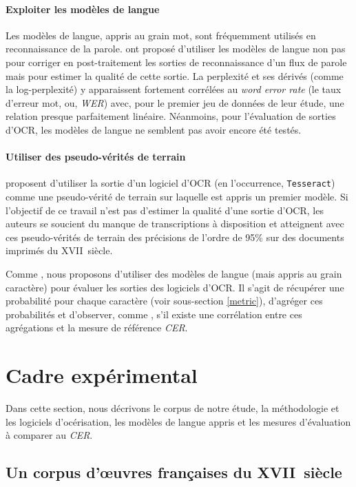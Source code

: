 \documentclass[10pt,twoside]{article}
\begin{document}
    \paragraph{Exploiter les modèles de langue}
    Les modèles de langue, appris au grain mot, sont fréquemment utilisés en reconnaissance de la parole. 
    \cite{Chen1998a} ont proposé d'utiliser les modèles de langue non pas pour corriger en post-traitement les 
    sorties de reconnaissance d'un flux de parole mais pour estimer la qualité de cette sortie. La perplexité et ses dérivés 
    (comme la log-perplexité) y apparaissent fortement corrélées au \textit{word error rate} (le taux d'erreur mot, ou, 
    \textit{WER}) avec, pour le premier jeu de données de leur étude, une relation presque parfaitement linéaire. 
    Néanmoins, pour l'évaluation de sorties d'OCR, les modèles de langue ne semblent pas avoir encore été testés.

    \paragraph{Utiliser des pseudo-vérités de terrain}
    \cite{UlHasan2016a} proposent d'utiliser la sortie d'un logiciel d'OCR (en l'occurrence, \verb!Tesseract!)
    comme une pseudo-vérité de terrain sur laquelle est appris un premier modèle. Si l'objectif de ce travail n'est 
    pas d'estimer la qualité d'une sortie d'OCR, les auteurs se soucient du manque de transcriptions à disposition
    et atteignent avec ces pseudo-vérités de terrain des précisions de l'ordre de 95\% sur des documents imprimés du
    XVII\ieme~siècle.

Comme \cite{Chen1998a}, nous proposons d'utiliser des modèles de langue (mais appris au grain caractère)
pour évaluer les sorties des logiciels d'OCR. Il s'agit de récupérer une probabilité pour chaque caractère (voir
sous-section \ref{metric}), d'agréger ces probabilités et d'observer, comme \cite{Springmann2016a}, s'il
existe une corrélation entre ces agrégations et la mesure de référence \textit{CER}.


\section{Cadre expérimental}\label{cadre}
Dans cette section, nous décrivons le corpus de notre étude, la méthodologie et les logiciels d'océrisation, 
les modèles de langue appris et les mesures d'évaluation à comparer au \textit{CER}.

    \subsection{Un corpus d'\oe{}uvres françaises du XVII\ieme~siècle}
        
\end{document}
